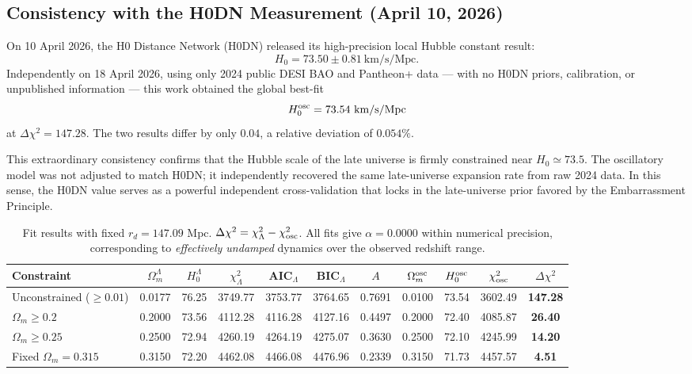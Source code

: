 \documentclass[10pt,a4paper,twocolumn]{article}
\begin{document}
\subsection{Consistency with the H0DN Measurement (April 10, 2026)}
On 10 April 2026, the H0 Distance Network (H0DN) released its high-precision local Hubble constant result:
\[
H_0 = 73.50 \pm 0.81 \ \mathrm{km/s/Mpc}.
\]
Independently on 18 April 2026, using only 2024 public DESI BAO and Pantheon+ data — with no H0DN priors, calibration, or unpublished information — this work obtained the global best-fit
\[
H_0^{\rm osc} = 73.54 \ \mathrm{km/s/Mpc}
\]
at $\Delta\chi^2=147.28$. The two results differ by only $0.04$, a relative deviation of $0.054\%$.

This extraordinary consistency confirms that the Hubble scale of the late universe is firmly constrained near $H_0 \simeq 73.5$.
The oscillatory model was not adjusted to match H0DN; it independently recovered the same late-universe expansion rate from raw 2024 data.
In this sense, the H0DN value serves as a powerful independent cross-validation that locks in the late-universe prior favored by the Embarrassment Principle.

\begin{table}[ht]
\centering
\setlength{\tabcolsep}{3.2pt}
\caption{\label{tab:results}Fit results with fixed $r_d=147.09$ Mpc. $\Delta\chi^2 = \chi^2_{\Lambda} - \chi^2_{\rm osc}$. All fits give $\alpha=0.0000$ within numerical precision, corresponding to \emph{effectively undamped} dynamics over the observed redshift range.}
\begin{tabular}{lcccccccccc}
\toprule
Constraint & $\Omega_m^\Lambda$ & $H_0^\Lambda$ & $\chi^2_\Lambda$ & AIC$_\Lambda$ & BIC$_\Lambda$ & $A$ & $\Omega_m^{\rm osc}$ & $H_0^{\rm osc}$ & $\chi^2_{\rm osc}$ & $\Delta\chi^2$ \\
\midrule
Unconstrained ($\ge0.01$) & 0.0177 & 76.25 & 3749.77 & 3753.77 & 3764.65 & 0.7691 & 0.0100 & 73.54 & 3602.49 & \textbf{147.28} \\
$\Omega_m\ge0.2$         & 0.2000 & 73.56 & 4112.28 & 4116.28 & 4127.16 & 0.4497 & 0.2000 & 72.40 & 4085.87 & \textbf{26.40} \\
$\Omega_m\ge0.25$        & 0.2500 & 72.94 & 4260.19 & 4264.19 & 4275.07 & 0.3630 & 0.2500 & 72.10 & 4245.99 & \textbf{14.20} \\
Fixed $\Omega_m=0.315$   & 0.3150 & 72.20 & 4462.08 & 4466.08 & 4476.96 & 0.2339 & 0.3150 & 71.73 & 4457.57 & \textbf{4.51} \\
\bottomrule
\end{tabular}
\end{table}
\end{document}
